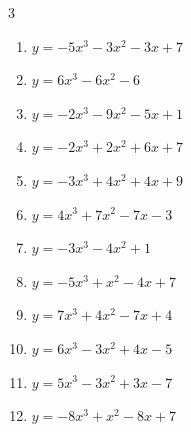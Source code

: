 \begin{multicols}{3}
\begin{enumerate}

  \item $y=-5x^{3}-3x^{2}-3x+7$


  \item $y=6x^{3}-6x^{2}-6$


  \item $y=-2x^{3}-9x^{2}-5x+1$


  \item $y=-2x^{3}+2x^{2}+6x+7$


  \item $y=-3x^{3}+4x^{2}+4x+9$


  \item $y=4x^{3}+7x^{2}-7x-3$


  \item $y=-3x^{3}-4x^{2}+1$


  \item $y=-5x^{3}+x^{2}-4x+7$


  \item $y=7x^{3}+4x^{2}-7x+4$


  \item $y=6x^{3}-3x^{2}+4x-5$


  \item $y=5x^{3}-3x^{2}+3x-7$


  \item $y=-8x^{3}+x^{2}-8x+7$



\end{enumerate}
\end{multicols}
